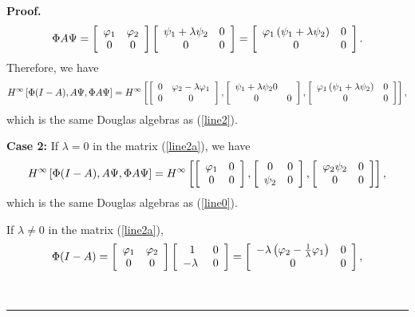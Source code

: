 \documentclass[10pt,a4paper]{amsart}
\newenvironment{proof}[1][Proof]{\noindent\textbf{#1.} }{\ \rule{0.5em}{0.5em}}
\begin{document}
\begin{proof}
\begin{align}
\Phi A\Psi=\left[
\begin{array}
[c]{cc}%
\varphi_{1} & \varphi_{2}\\
0 & 0
\end{array}
\right]  \left[
\begin{array}
[c]{cc}%
\psi_{1}+\lambda\psi_{2} & 0\\
0 & 0
\end{array}
\right]  =\left[
\begin{array}
[c]{cc}%
\varphi_{1}\left(  \psi_{1}+\lambda\psi_{2}\right)  & 0\\
0 & 0
\end{array}
\right]  .\nonumber
\end{align}
Therefore, we have
\[
H^{\infty}\left[  \Phi(I-A),A\Psi,\Phi A\Psi\right]  =H^{\infty} \left[
\left[
\begin{array}
[c]{cc}%
0 & \varphi_{2}-\lambda\varphi_{1}\\
0 & 0
\end{array}
\right]  ,\left[
\begin{array}
[c]{cc}%
\psi_{1}+\lambda\psi_{2} 0 & \\
0 & 0
\end{array}
\right]  ,\left[
\begin{array}
[c]{cc}%
\varphi_{1}\left(  \psi_{1}+\lambda\psi_{2}\right)  & 0\\
0 & 0
\end{array}
\right]  \right]  ,
\]
which is the same Douglas algebras as (\ref{line2}).

\textbf{{Case 2:}} If $\lambda=0$ in the matrix (\ref{line2a}), we have
\[
H^{\infty}\left[  \Phi(I-A),A\Psi,\Phi A\Psi\right]  =H^{\infty} \left[
\left[
\begin{array}
[c]{cc}%
\varphi_{1} & 0\\
0 & 0
\end{array}
\right]  ,\left[
\begin{array}
[c]{cc}%
0 & 0\\
\psi_{2} & 0
\end{array}
\right]  ,\left[
\begin{array}
[c]{cc}%
\varphi_{2}\psi_{2} & 0\\
0 & 0
\end{array}
\right]  \right]  ,
\]
which is the same Douglas algebras as (\ref{line0}).

If $\lambda\neq0$ in the matrix (\ref{line2a}),
\begin{align}
\Phi(I-A)=\left[
\begin{array}
[c]{cc}%
\varphi_{1} & \varphi_{2}\\
0 & 0
\end{array}
\right]  \left[
\begin{array}
[c]{cc}%
1 & 0\\
-\lambda\  & 0
\end{array}
\right]  =\left[
\begin{array}
[c]{cc}%
-\lambda\left(  \varphi_{2}-\frac{1}{\lambda}\varphi_{1}\right)  & 0\\
0 & 0
\end{array}
\right]  ,\nonumber
\end{align}
%


\end{proof}
\end{document}
